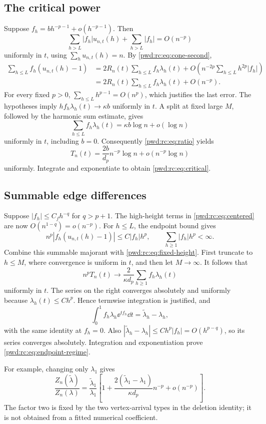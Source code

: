 \documentclass[11pt,letterpaper]{article}
\numberwithin{equation}{section}
\theoremstyle{remark}\newtheorem{remark}[theorem]{Remark}
\begin{document}
\subsection{The critical power}
Suppose $f_h=b h^{-p-1}+o(h^{-p-1})$. Then
\[
 \sum_{h>L}|f_h|u_{n,t}(h)+\sum_{h>L}|f_h|=O(n^{-p})
\]
uniformly in $t$, using $\sum_hu_{n,t}(h)=n$. By \eqref{pwd:rc:eq:cone-second},
\begin{align*}
 \sum_{h\le L}f_h(u_{n,t}(h)-1)
 &=2R_n(t)\sum_{h\le L}f_h\lambda_h(t)
   +O\left(n^{-2p}\sum_{h\le L}h^{2p}|f_h|\right)\\
 &=2R_n(t)\sum_{h\le L}f_h\lambda_h(t)+O(n^{-p}).
\end{align*}
For every fixed $p>0$, $\sum_{h\le L}h^{p-1}=O(n^p)$, which justifies the last error. The hypotheses imply $h f_h\lambda_h(t)\to\kappa b$ uniformly in $t$. A split at fixed large $M$, followed by the harmonic sum estimate, gives
\[
 \sum_{h\le L}f_h\lambda_h(t)=\kappa b\log n+o(\log n)
\]
uniformly in $t$, including $b=0$. Consequently \eqref{pwd:rc:eq:ratio} yields
\[
 T_n(t)=\frac{2b}{d_p}n^{-p}\log n+o(n^{-p}\log n)
\]
uniformly. Integrate and exponentiate to obtain \eqref{pwd:rc:eq:critical}.

\subsection{Summable edge differences}
Suppose $|f_h|\le C_fh^{-q}$ for $q>p+1$. The high-height terms in \eqref{pwd:rc:eq:centered} are now $O(n^{1-q})=o(n^{-p})$. For $h\le L$, the endpoint bound gives
\[
 n^p|f_h(u_{n,t}(h)-1)|\le C|f_h|h^p,
 \qquad\sum_{h\ge1}|f_h|h^p<\infty.
\]
Combine this summable majorant with \eqref{pwd:rc:eq:fixed-height}. First truncate to $h\le M$, where convergence is uniform in $t$, and then let $M\to\infty$. It follows that
\[
 n^pT_n(t)\longrightarrow\frac2{\kappa d_p}
 \sum_{h\ge1}f_h\lambda_h(t)
\]
uniformly in $t$. The series on the right converges absolutely and uniformly because $\lambda_h(t)\le Ch^p$. Hence termwise integration is justified, and
\[
 \int_0^1 f_h\lambda_h\ee^{tf_h}\dd t
 =\widetilde\lambda_h-\lambda_h,
\]
with the same identity at $f_h=0$. Also
$|\widetilde\lambda_h-\lambda_h|\le C h^p|f_h|=O(h^{p-q})$,
so its series converges absolutely. Integration and exponentiation prove \eqref{pwd:rc:eq:endpoint-regime}.

For example, changing only $\lambda_1$ gives
\[
 \frac{Z_n(\widetilde\lambda)}{Z_n(\lambda)}
 =\frac{\widetilde\lambda_1}{\lambda_1}
 \left[1+\frac{2(\widetilde\lambda_1-\lambda_1)}{\kappa d_p}n^{-p}
 +o(n^{-p})\right].
\]
The factor two is fixed by the two vertex-arrival types in the deletion identity; it is not obtained from a fitted numerical coefficient.
\end{document}
